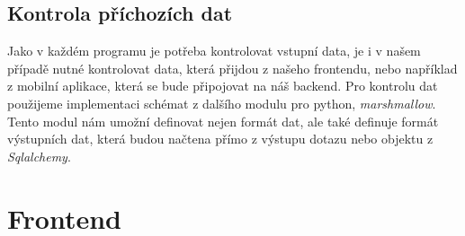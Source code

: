 \clearpage

\subsection{Kontrola příchozích dat}

Jako v každém programu je potřeba kontrolovat vstupní data, je i v našem případě nutné kontrolovat data, která přijdou z našeho frontendu, nebo například z mobilní aplikace,
která se bude připojovat na náš backend. Pro kontrolu dat použijeme implementaci schémat z dalšího modulu pro python, \textit{marshmallow}. Tento modul nám umožní definovat
nejen formát dat, ale také definuje formát výstupních dat, která budou načtena přímo z výstupu dotazu nebo objektu z \textit{Sqlalchemy}.

\section{Frontend}